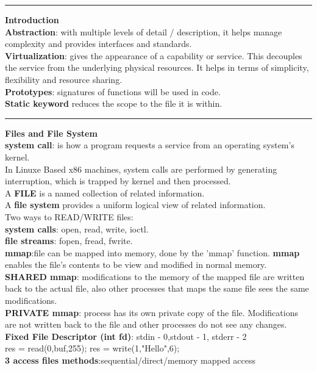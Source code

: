 \documentclass[8pt,a4paper,landscape]{article}
\newcommand{\topic}[1]{\textbf{\large #1}}
\newcommand{\hs}{\hspace*{3mm}}
\begin{document}
\begin{spacing}{-1}
\begin{multicols*}{3}
    \hrule \noindent
    \topic{Introduction}  \\
    \textbf{Abstraction}: with multiple levels of detail / description, it helps manage complexity and provides interfaces and standards. \\
    \textbf{Virtualization}: gives the appearance of a capability or service. This decouples the service from the underlying physical resources. It helps in terms of simplicity, flexibility and resource sharing. \\
    \textbf{Prototypes}: signatures of functions will be used in code. \\
    \textbf{Static keyword} reduces the scope to the file it is within.\\
    \hrule \noindent
    \topic{Files and File System} \\
    \textbf{system call}: is how a program requests a service from an operating system's kernel. \\
    In Linuxe Based x86 machines, system calls are performed by generating interruption, 
    which is trapped by kernel and then processed. \\
    A \textbf{FILE} is a named collection of related information.  \\
    A \textbf{file system} provides a uniform logical view of related information. \\
    Two ways to READ/WRITE files: \\
    \hs \textbf{system calls}: open, read, write, ioctl.\\
    \hs \textbf{file streams}: fopen, fread, fwrite. \\
    \textbf{mmap}:file can be mapped into memory, done by the 'mmap' function. 
    \textbf{mmap} enables the file's contents to be view and modified in normal memory. \\
    \textbf{SHARED mmap}: modifications to the memory of the mapped file are written back to the actual file, also other processes that maps the same file sees the same modifications. \\
    \textbf{PRIVATE mmap}: process has its own private copy of the file. Modifications are not written back to the file and other processes do not see any changes. \\
    \textbf{Fixed File Descriptor (int fd)}: stdin - 0,stdout - 1, stderr - 2 \\
    res = read(0,buf,255);   res = write(1,"Hello",6); \\
    \textbf{3 access files methods}:sequential/direct/memory mapped access


\end{multicols*}
\end{spacing}
\end{document}
